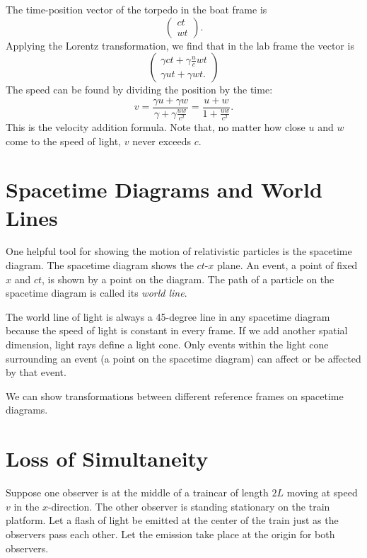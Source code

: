 \documentclass[12pt]{scrartcl}
\begin{document}
The time-position vector of the torpedo in the boat frame is
\[\begin{pmatrix}
		ct \\ wt
	\end{pmatrix}. \] Applying the Lorentz transformation, we find that in the lab frame the vector is
\[
	\begin{pmatrix}
		\gamma c t + \gamma \frac{u}{c } w t \\
		\gamma u t + \gamma w t.
	\end{pmatrix}
\]
The speed can be found by dividing the position by the time:
\[
	v = \frac{\gamma u + \gamma w}{\gamma + \gamma \frac{uw}{c^2}} = \frac{u+w}{1+\frac{uw}{c^2}}.
\]
This is the velocity addition formula. Note that, no matter how close $u$ and $w$ come to the speed of light, $v$ never exceeds $c$.

\section{Spacetime Diagrams and World Lines}
One helpful tool for showing the motion of relativistic particles is the spacetime diagram. The spacetime diagram shows the $ct$-$x$ plane. An event, a point of fixed $x$ and $ct$, is shown by a point on the diagram. The path of a particle on the spacetime diagram is called its \textit{world line}.

The world line of light is always a 45-degree line in any spacetime diagram because the speed of light is constant in every frame. If we add another spatial dimension, light rays define a light cone. Only events within the light cone surrounding an event (a point on the spacetime diagram) can affect or be affected by that event.

We can show transformations between different reference frames on spacetime diagrams.

\section{Loss of Simultaneity}
Suppose one observer is at the middle of a traincar of length $2L$ moving at speed $v$ in the $x$-direction. The other observer is standing stationary on the train platform. Let a flash of light be emitted at the center of the train just as the observers pass each other. Let the emission take place at the origin for both observers.
\end{document}
